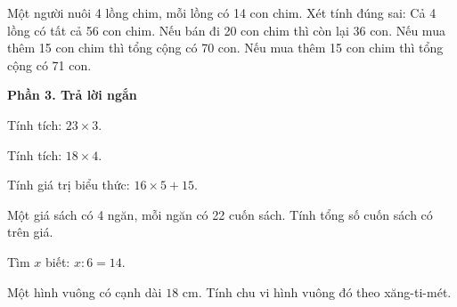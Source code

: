 \begin{ex} %
Một người nuôi 4 lồng chim, mỗi lồng có 14 con chim. Xét tính đúng sai:
\choiceTF
{\True Cả 4 lồng có tất cả 56 con chim.}
{\True Nếu bán đi 20 con chim thì còn lại 36 con.}
{Nếu mua thêm 15 con chim thì tổng cộng có 70 con.}
{\True Nếu mua thêm 15 con chim thì tổng cộng có 71 con.}
\end{ex}

\textbf{Phần 3. Trả lời ngắn}

\begin{ex} %
Tính tích: $23 \times 3$.
\end{ex}

\begin{ex} %
Tính tích: $18 \times 4$.
\end{ex}

\begin{ex} %
Tính giá trị biểu thức: $16 \times 5 + 15$.
\end{ex}

\begin{ex} %
Một giá sách có 4 ngăn, mỗi ngăn có 22 cuốn sách. Tính tổng số cuốn sách có trên giá.
\end{ex}

\begin{ex} %
Tìm $x$ biết: $x : 6 = 14$.
\end{ex}

\begin{ex} %
Một hình vuông có cạnh dài $18\text{ cm}$. Tính chu vi hình vuông đó theo xăng-ti-mét.
\end{ex}

